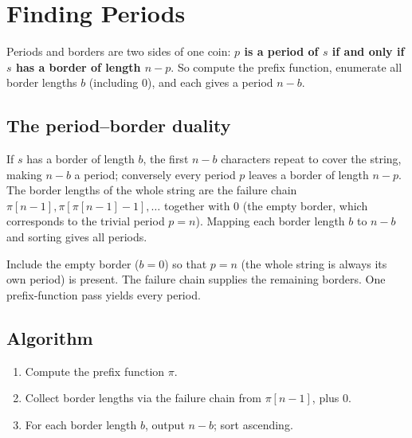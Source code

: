 \section{Finding Periods}
\label{sec:cses-finding-periods}


\begin{patternbox}
Periods and borders are two sides of one coin: \textbf{$p$ is a period of
$s$ if and only if $s$ has a border of length $n-p$}. So compute the
prefix function, enumerate all border lengths $b$ (including $0$), and
each gives a period $n-b$.
\end{patternbox}

\subsection*{The period--border duality}

If $s$ has a border of length $b$, the first $n-b$ characters repeat to
cover the string, making $n-b$ a period; conversely every period $p$
leaves a border of length $n-p$. The border lengths of the whole string
are the failure chain $\pi[n-1],\pi[\pi[n-1]-1],\ldots$ together with $0$
(the empty border, which corresponds to the trivial period $p=n$). Mapping
each border length $b$ to $n-b$ and sorting gives all periods.

\begin{ideabox}
Include the empty border ($b=0$) so that $p=n$ (the whole string is always
its own period) is present. The failure chain supplies the remaining
borders. One prefix-function pass yields every period.
\end{ideabox}

\subsection*{Algorithm}

\begin{enumerate}
  \item Compute the prefix function $\pi$.
  \item Collect border lengths via the failure chain from $\pi[n-1]$,
        plus $0$.
  \item For each border length $b$, output $n-b$; sort ascending.
\end{enumerate}

